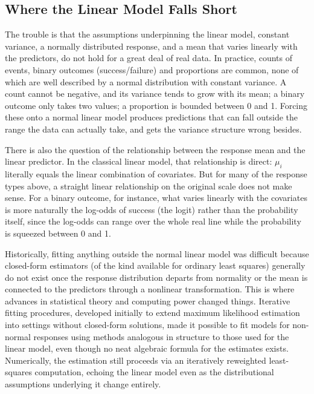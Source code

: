 \documentclass[12pt,a4paper]{report}
\begin{document}
\subsection*{Where the Linear Model Falls Short}

The trouble is that the assumptions underpinning the linear model, constant variance, a normally distributed response, and a mean that varies linearly with the predictors, do not hold for a great deal of real data. In practice, counts of events, binary outcomes (success/failure) and proportions are common, none of which are well described by a normal distribution with constant variance. A count cannot be negative, and its variance tends to grow with its mean; a binary outcome only takes two values; a proportion is bounded between 0 and 1. Forcing these onto a normal linear model produces predictions that can fall outside the range the data can actually take, and gets the variance structure wrong besides.

There is also the question of the relationship between the response mean and the linear predictor. In the classical linear model, that relationship is direct: $\mu_i$ literally equals the linear combination of covariates. But for many of the response types above, a straight linear relationship on the original scale does not make sense. For a binary outcome, for instance, what varies linearly with the covariates is more naturally the log-odds of success (the logit) rather than the probability itself, since the log-odds can range over the whole real line while the probability is squeezed between 0 and 1.

Historically, fitting anything outside the normal linear model was difficult because closed-form estimators (of the kind available for ordinary least squares) generally do not exist once the response distribution departs from normality or the mean is connected to the predictors through a nonlinear transformation. This is where advances in statistical theory and computing power changed things. Iterative fitting procedures, developed initially to extend maximum likelihood estimation into settings without closed-form solutions, made it possible to fit models for non-normal responses using methods analogous in structure to those used for the linear model, even though no neat algebraic formula for the estimates exists. Numerically, the estimation still proceeds via an iteratively reweighted least-squares computation, echoing the linear model even as the distributional assumptions underlying it change entirely.
\end{document}
